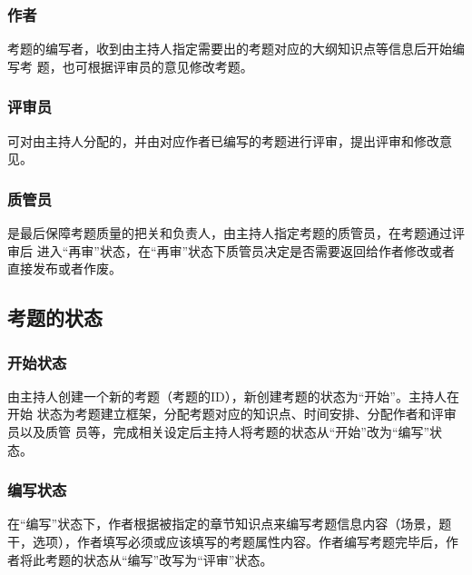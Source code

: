 \documentclass[hyperref, a4paper]{ctexart}
\begin{document}
\hypertarget{ux4f5cux8005}{%
\subsubsection{作者}\label{ux4f5cux8005}}

考题的编写者，收到由主持人指定需要出的考题对应的大纲知识点等信息后开始编写考
题，也可根据评审员的意见修改考题。

\hypertarget{ux8bc4ux5ba1ux5458}{%
\subsubsection{评审员}\label{ux8bc4ux5ba1ux5458}}

可对由主持人分配的，并由对应作者已编写的考题进行评审，提出评审和修改意见。

\hypertarget{ux8d28ux7ba1ux5458}{%
\subsubsection{质管员}\label{ux8d28ux7ba1ux5458}}

是最后保障考题质量的把关和负责人，由主持人指定考题的质管员，在考题通过评审后
进入``再审''状态，在``再审''状态下质管员决定是否需要返回给作者修改或者直接发布或者作废。

\hypertarget{ux8003ux9898ux7684ux72b6ux6001}{%
\subsection{考题的状态}\label{ux8003ux9898ux7684ux72b6ux6001}}

\hypertarget{ux5f00ux59cbux72b6ux6001}{%
\subsubsection{开始状态}\label{ux5f00ux59cbux72b6ux6001}}

由主持人创建一个新的考题（考题的ID），新创建考题的状态为``开始''。主持人在开始
状态为考题建立框架，分配考题对应的知识点、时间安排、分配作者和评审员以及质管
员等，完成相关设定后主持人将考题的状态从``开始''改为``编写''状态。

\hypertarget{ux7f16ux5199ux72b6ux6001}{%
\subsubsection{编写状态}\label{ux7f16ux5199ux72b6ux6001}}

在``编写''状态下，作者根据被指定的章节知识点来编写考题信息内容（场景，题干，选项），作者填写必须或应该填写的考题属性内容。作者编写考题完毕后，作者将此考题的状态从``编写''改写为``评审''状态。
\end{document}
